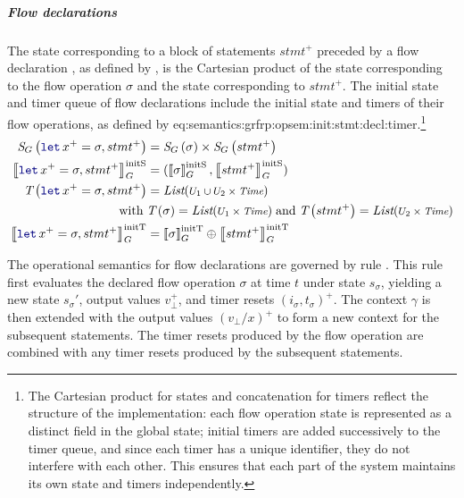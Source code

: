 \subparagraph{Flow declarations}
The state corresponding to a block of statements $stmt^+$ preceded by a flow declaration
, as defined by , is the
Cartesian product of the state corresponding to the flow operation $\sigma$ and the state
corresponding to $stmt^+$.
%
The initial state and timer queue of flow declarations include the initial state and timers of their
flow operations, as defined by 
{eq:semantics:grfrp:opsem:init:stmt:decl:timer}.\footnote{The Cartesian product for states and
    concatenation for timers reflect the structure of the implementation: each flow operation state is
    represented as a distinct field in the global state; initial timers are added successively to the
    timer queue, and since each timer has a unique identifier, they do not interfere with each other.
    This ensures that each part of the system maintains its own state and timers independently.}
\begin{align}
    \stateTy{\decl{x^+}{\sigma}, stmt^+}   & = \stateTy{\sigma} \times \stateTy{stmt^+} \label{eq:semantics:grfrp:opsem:stateTy:stmt:decl}                    \\
    \initstate{\decl{x^+}{\sigma}, stmt^+} & = (\initstate{\sigma}, \initstate{stmt^+}) \label{eq:semantics:grfrp:opsem:init:stmt:decl:state}                 \\
    \timerTy{\decl{x^+}{\sigma}, stmt^+}   & = \List{U_1 \cup U_2 \times \Time} \label{eq:semantics:grfrp:opsem:timerTy:stmt:decl}                            \\
    \text{with} \;                         & \timerTy{\sigma} = \List{U_1 \times \Time} \; \text{and} \; \timerTy{stmt^+} = \List{U_2 \times \Time} \nonumber \\
    \inittimer{\decl{x^+}{\sigma}, stmt^+} & = \inittimer{\sigma} \lstconcat \inittimer{stmt^+} \label{eq:semantics:grfrp:opsem:init:stmt:decl:timer}
\end{align}

The operational semantics for flow declarations are governed by rule
. This rule first evaluates the declared flow
operation $\sigma$ at time $t$ under state $s_\sigma$, yielding a new state $s_\sigma'$, output
values $v_\bot^+$, and timer resets $(i_\sigma, t_\sigma)^+$. The context $\gamma$ is then extended
with the output values $(v_\bot/x)^+$ to form a new context for the subsequent statements. The timer
resets produced by the flow operation are combined with any timer resets produced by the subsequent
statements.

